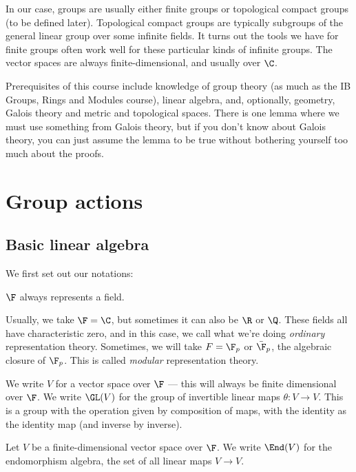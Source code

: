 \documentclass[a4paper]{article}
\begin{document}
In our case, groups are usually either finite groups or topological compact groups (to be defined later). Topological compact groups are typically subgroups of the general linear group over some infinite fields. It turns out the tools we have for finite groups often work well for these particular kinds of infinite groups. The vector spaces are always finite-dimensional, and usually over $\C$.

Prerequisites of this course include knowledge of group theory (as much as the IB Groups, Rings and Modules course), linear algebra, and, optionally, geometry, Galois theory and metric and topological spaces. There is one lemma where we must use something from Galois theory, but if you don't know about Galois theory, you can just assume the lemma to be true without bothering yourself too much about the proofs.


\section{Group actions}

\subsection{Basic linear algebra}
We first set out our notations:

\begin{notation}
  $\F$ always represents a field.
\end{notation}

Usually, we take $\F = \C$, but sometimes it can also be $\R$ or $\Q$. These fields all have characteristic zero, and in this case, we call what we're doing \emph{ordinary} representation theory. Sometimes, we will take $F = \F_p$ or $\bar{\F}_p$, the algebraic closure of $\F_p$. This is called \emph{modular} representation theory.

\begin{notation}
  We write $V$ for a vector space over $\F$ --- this will always be finite dimensional over $\F$. We write $\GL(V)$ for the group of invertible linear maps $\theta: V \to V$. This is a group with the operation given by composition of maps, with the identity as the identity map (and inverse by inverse).
\end{notation}

\begin{notation}
  Let $V$ be a finite-dimensional vector space over $\F$. We write $\End(V)$ for the endomorphism algebra, the set of all linear maps $V \to V$.
\end{notation}
\end{document}
